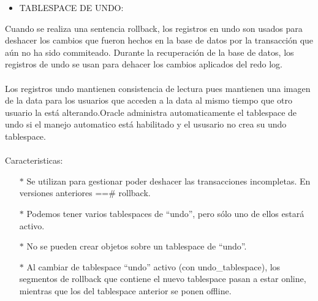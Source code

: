 \begin{itemize}
	\item TABLESPACE DE UNDO:
\end{itemize}
\begin{adjustwidth}{0.40in}{0.0in}
	Cuando se realiza una sentencia rollback, los registros en undo son usados para deshacer los cambios que fueron hechos en la base de datos por la transacción que aún no ha sido commiteado. Durante la recuperación de la base de datos, los registros de undo se usan para dehacer los cambios aplicados del redo log. \\ \\
	Los registros undo mantienen consistencia de lectura pues mantienen una imagen de la data para los usuarios que acceden a la data al mismo tiempo que otro usuario la está alterando.Oracle administra automaticamente el tablespace de undo si el manejo automatico está habilitado y el ususario no crea su undo tablespace.\\ \\	
	Caracteristicas:
	\begin{itemize}
		\item[$*$] Se utilizan para gestionar poder deshacer las transacciones incompletas. En versiones anteriores  ==\# rollback.
		\item[$*$] Podemos tener varios tablespaces de “undo”, pero sólo uno de ellos estará activo.
		\item[$*$] No se pueden crear objetos sobre un tablespace de “undo”.
		\item[$*$] Al cambiar de tablespace “undo” activo (con undo\_tablespace), los segmentos de rollback que contiene el nuevo tablespace pasan a estar online, mientras que los del tablespace anterior se ponen offline.\\
\\
	\end{itemize}
\end{adjustwidth}
